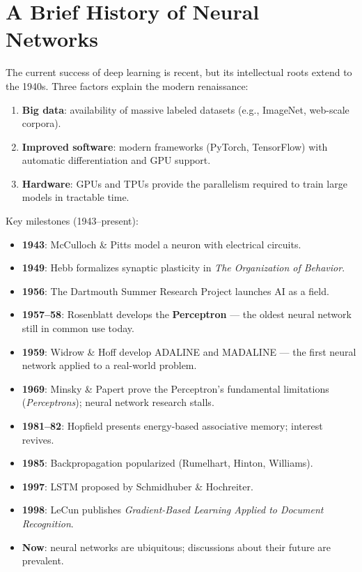 \documentclass[11pt,a4paper]{article}
\theoremstyle{definition}
\theoremstyle{plain}
\theoremstyle{remark}
\begin{document}
\section{A Brief History of Neural Networks}

The current success of deep learning is recent, but its intellectual roots extend to the 1940s. Three factors explain the modern renaissance:

\begin{enumerate}
    \item \textbf{Big data}: availability of massive labeled datasets (e.g., ImageNet, web-scale corpora).
    \item \textbf{Improved software}: modern frameworks (PyTorch, TensorFlow) with automatic differentiation and GPU support.
    \item \textbf{Hardware}: GPUs and TPUs provide the parallelism required to train large models in tractable time.
\end{enumerate}

Key milestones (1943--present):

\begin{itemize}
    \item \textbf{1943}: McCulloch \& Pitts model a neuron with electrical circuits.
    \item \textbf{1949}: Hebb formalizes synaptic plasticity in \textit{The Organization of Behavior}.
    \item \textbf{1956}: The Dartmouth Summer Research Project launches AI as a field.
    \item \textbf{1957--58}: Rosenblatt develops the \textbf{Perceptron} --- the oldest neural network still in common use today.
    \item \textbf{1959}: Widrow \& Hoff develop ADALINE and MADALINE --- the first neural network applied to a real-world problem.
    \item \textbf{1969}: Minsky \& Papert prove the Perceptron's fundamental limitations (\textit{Perceptrons}); neural network research stalls.
    \item \textbf{1981--82}: Hopfield presents energy-based associative memory; interest revives.
    \item \textbf{1985}: Backpropagation popularized (Rumelhart, Hinton, Williams).
    \item \textbf{1997}: LSTM proposed by Schmidhuber \& Hochreiter.
    \item \textbf{1998}: LeCun publishes \textit{Gradient-Based Learning Applied to Document Recognition}.
    \item \textbf{Now}: neural networks are ubiquitous; discussions about their future are prevalent.
\end{itemize}
\end{document}
